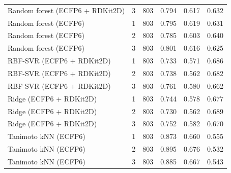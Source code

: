 \begin{longtable}{L{0.40\textwidth}rrrrr}
Random forest (ECFP6 + RDKit2D) & 3 & 803 & 0.794 & 0.617 & 0.632 \\
Random forest (ECFP6) & 1 & 803 & 0.795 & 0.619 & 0.631 \\
Random forest (ECFP6) & 2 & 803 & 0.785 & 0.603 & 0.640 \\
Random forest (ECFP6) & 3 & 803 & 0.801 & 0.616 & 0.625 \\
RBF-SVR (ECFP6 + RDKit2D) & 1 & 803 & 0.733 & 0.571 & 0.686 \\
RBF-SVR (ECFP6 + RDKit2D) & 2 & 803 & 0.738 & 0.562 & 0.682 \\
RBF-SVR (ECFP6 + RDKit2D) & 3 & 803 & 0.761 & 0.580 & 0.662 \\
Ridge (ECFP6 + RDKit2D) & 1 & 803 & 0.744 & 0.578 & 0.677 \\
Ridge (ECFP6 + RDKit2D) & 2 & 803 & 0.730 & 0.562 & 0.689 \\
Ridge (ECFP6 + RDKit2D) & 3 & 803 & 0.752 & 0.582 & 0.670 \\
Tanimoto kNN (ECFP6) & 1 & 803 & 0.873 & 0.660 & 0.555 \\
Tanimoto kNN (ECFP6) & 2 & 803 & 0.895 & 0.676 & 0.532 \\
Tanimoto kNN (ECFP6) & 3 & 803 & 0.885 & 0.667 & 0.543 \\
\bottomrule
\end{longtable}
\endgroup

